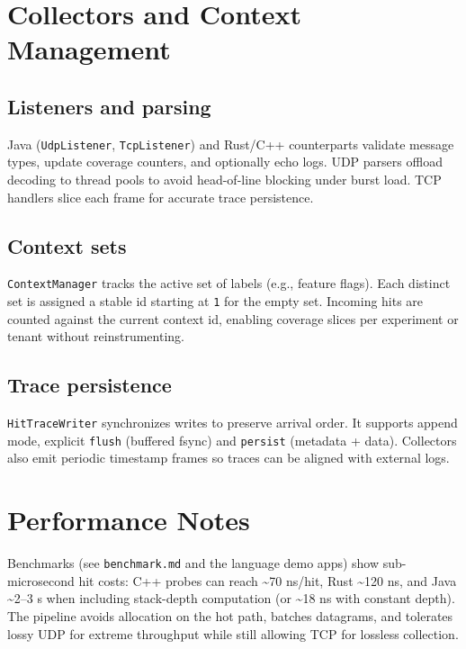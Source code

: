 \documentclass[11pt]{article}
\begin{document}
\section{Collectors and Context Management}
\subsection{Listeners and parsing}
Java (\texttt{UdpListener}, \texttt{TcpListener}) and Rust/C++ counterparts validate message types, update coverage counters, and optionally echo logs. UDP parsers offload decoding to thread pools to avoid head-of-line blocking under burst load. TCP handlers slice each frame for accurate trace persistence.

\subsection{Context sets}
\texttt{ContextManager} tracks the active set of labels (e.g., feature flags). Each distinct set is assigned a stable id starting at \texttt{1} for the empty set. Incoming hits are counted against the current context id, enabling coverage slices per experiment or tenant without reinstrumenting.

\subsection{Trace persistence}
\texttt{HitTraceWriter} synchronizes writes to preserve arrival order. It supports append mode, explicit \texttt{flush} (buffered fsync) and \texttt{persist} (metadata + data). Collectors also emit periodic timestamp frames so traces can be aligned with external logs.

\section{Performance Notes}
Benchmarks (see \texttt{benchmark.md} and the language demo apps) show sub-microsecond hit costs: C++ probes can reach \textasciitilde70 ns/hit, Rust \textasciitilde120 ns, and Java \textasciitilde2--3 \textmu s when including stack-depth computation (or \textasciitilde18 ns with constant depth). The pipeline avoids allocation on the hot path, batches datagrams, and tolerates lossy UDP for extreme throughput while still allowing TCP for lossless collection.
\end{document}
